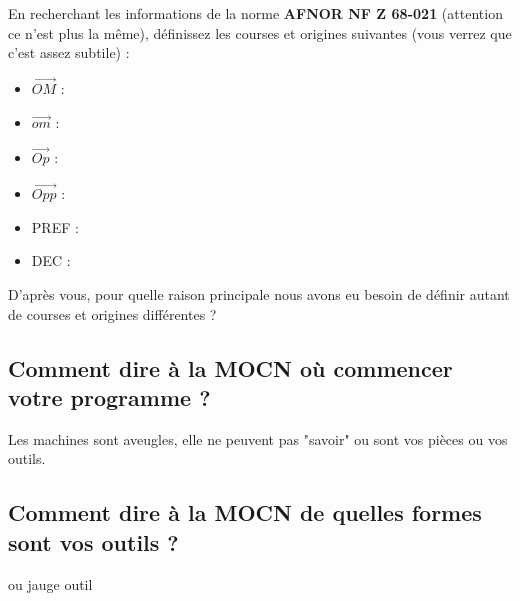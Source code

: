 \documentclass[12pt]{article}
\newcounter{exo}
\newenvironment{exo}{\stepcounter{exo}\vspace{0.5cm}{\bfseries Question \theexo\ :}}{\par\vspace{0.5cm}}
\begin{document}
\begin{exo}\label{exo1} En recherchant les informations de la norme \textbf{AFNOR NF Z 68-021} (attention ce n'est plus la même), définissez les courses et origines suivantes (vous verrez que c'est assez subtile) :\end{exo}
\begin{itemize}
    \item $\overrightarrow{OM}$ :
    \item $\overrightarrow{om}$ :
    \item $\overrightarrow{Op}$ :
    \item $\overrightarrow{Opp}$ :
    \item PREF :
    \item DEC :
\end{itemize}


\begin{exo}\label{exo1} D'après vous, pour quelle raison principale nous avons eu besoin de définir autant de courses et origines différentes ? \end{exo}




\subsection{Comment dire à la MOCN où commencer votre programme ?}
Les machines sont aveugles, elle ne peuvent pas "savoir" ou sont vos pièces ou vos outils.



\subsection{Comment dire à la MOCN de quelles formes sont vos outils ?}
ou jauge outil




\end{document}
